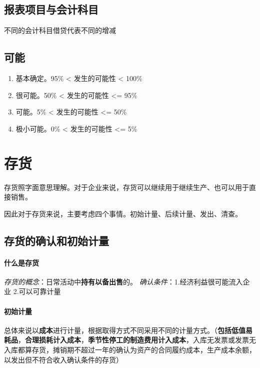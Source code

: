\documentclass[UTF8,12pt]{ctexart}
\numberwithin{equation}{section} %
\numberwithin{figure}{section}
\numberwithin{table}{section}
\begin{document}
	\subsection{报表项目与会计科目}
	不同的会计科目借贷代表不同的增减
	
	\subsection{可能}
	\begin{enumerate}
		\item 基本确定。95\% < 发生的可能性 < 100\%
		
		\item 很可能。50\% < 发生的可能性 <= 95\%
		
		\item 可能。5\% < 发生的可能性 <= 50\%
		
		\item 极小可能。0\% < 发生的可能性 <= 5\%
	\end{enumerate}
	
	
	\newpage
	
	\section{存货}
	存货照字面意思理解。对于企业来说，存货可以继续用于继续生产、也可以用于直接销售。
	
	因此对于存货来说，主要考虑四个事情。初始计量、后续计量、发出、清查。
	
	\subsection{存货的确认和初始计量}
	\paragraph{什么是存货} 
	\textit{存货的概念}：日常活动中\textbf{持有以备出售}的。 
	\textit{确认条件}：1.经济利益很可能流入企业 2.可以可靠计量
	
	\paragraph{初始计量}
	总体来说以\textbf{成本}进行计量，根据取得方式不同采用不同的计量方式。（\textbf{包括低值易耗品}，\textbf{合理损耗计入成本}，\textbf{季节性停工的制造费用计入成本}，入库无发票或发票无入库都算存货，摊销期不超过一年的确认为资产的合同履约成本，生产成本余额，以发出但不符合收入确认条件的存货）
	
\end{document}
